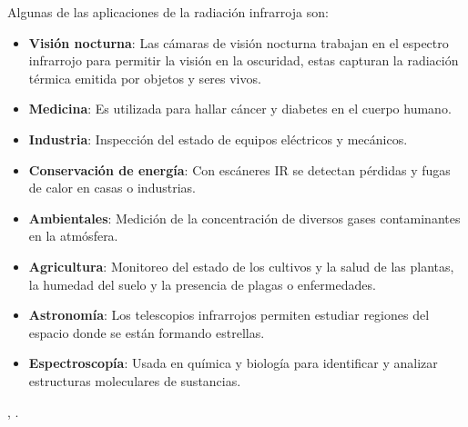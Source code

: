             \begin{table}[htbp]
                \caption{División de la radiación infrarroja.}
                \begin{center}
                \label{tab:Div_IR}
                \end{center}
            \end{table}
            
            \newpage
            
Algunas de las aplicaciones de la radiación infrarroja son:
			\begin{itemize}
				\item \textbf{Visión nocturna}: Las cámaras de visión nocturna trabajan en el espectro infrarrojo para permitir la visión en la oscuridad, estas capturan la radiación térmica emitida por objetos y seres vivos.
				\item \textbf{Medicina}: Es utilizada para hallar cáncer y diabetes en el cuerpo humano.
				\item \textbf{Industria}: Inspección del estado de equipos eléctricos y mecánicos.
				\item \textbf{Conservación de energía}: Con escáneres IR se detectan pérdidas y fugas de calor en casas o industrias.
				\item \textbf{Ambientales}: Medición de la concentración de diversos gases contaminantes en la atmósfera.
				\item \textbf{Agricultura}: Monitoreo del estado de los cultivos y la salud de las plantas, la humedad del suelo y la presencia de plagas o enfermedades.
				\item \textbf{Astronomía}: Los telescopios infrarrojos permiten estudiar regiones del espacio donde se están formando estrellas.
				\item \textbf{Espectroscopía}: Usada en química y biología para identificar y analizar estructuras moleculares de sustancias.		
			\end{itemize}
\cite{Rogalski}, \cite{BlancoMDA}.

